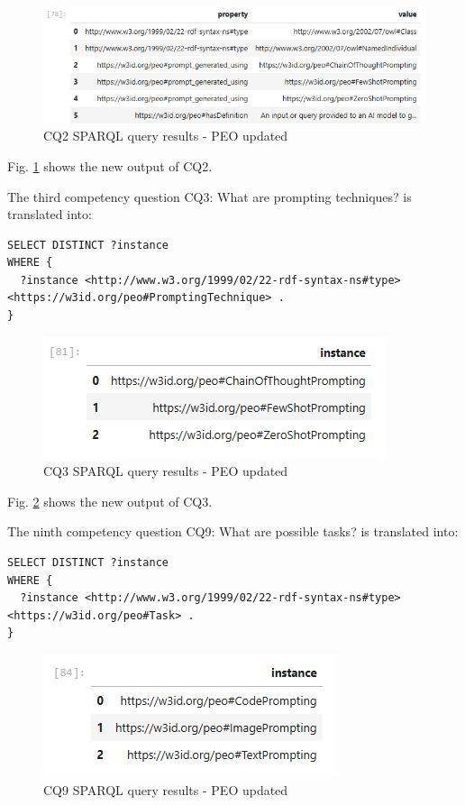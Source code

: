 \begin{figure}[H]
    \centering
    \includegraphics[width=0.9\linewidth]{Figures/fig_70.png}
    \caption{CQ2 SPARQL query results - PEO updated}
    \label{fig:70}
\end{figure}
Fig. \ref{fig:70} shows the new output of CQ2.

The third competency question CQ3: What are prompting techniques?
is translated into:
\begin{lstlisting}
SELECT DISTINCT ?instance
WHERE {
  ?instance <http://www.w3.org/1999/02/22-rdf-syntax-ns#type> <https://w3id.org/peo#PromptingTechnique> .
}
\end{lstlisting}


\begin{figure}[H]
    \centering
    \includegraphics[width=0.7\linewidth]{Figures/fig_71.png}
    \caption{CQ3 SPARQL query results - PEO updated}
    \label{fig:71}
\end{figure}
Fig. \ref{fig:71} shows the new output of CQ3.

The ninth competency question CQ9: What are possible tasks? is translated into:
\begin{lstlisting}
SELECT DISTINCT ?instance
WHERE {
  ?instance <http://www.w3.org/1999/02/22-rdf-syntax-ns#type> <https://w3id.org/peo#Task> .
}
\end{lstlisting}

\begin{figure}[H]
    \centering
    \includegraphics[width=0.6\linewidth]{Figures/fig_72.png}
    \caption{CQ9 SPARQL query results - PEO updated}
    \label{fig:72}
\end{figure}

